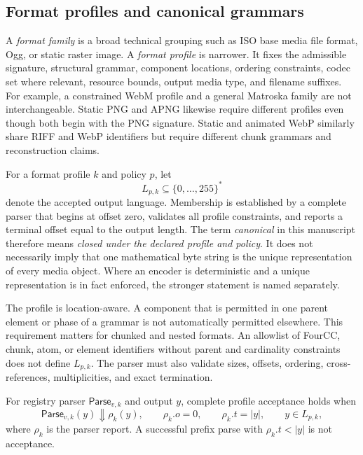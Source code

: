 \subsection{Format profiles and canonical grammars}

A \emph{format family} is a broad technical grouping such as ISO base media file
format, Ogg, or static raster image. A \emph{format profile} is narrower. It
fixes the admissible signature, structural grammar, component locations,
ordering constraints, codec set where relevant, resource bounds, output media
type, and filename suffixes. For example, a constrained WebM profile and a
general Matroska family are not interchangeable. Static PNG and APNG likewise
require different profiles even though both begin with the PNG signature.
Static and animated WebP similarly share RIFF and WebP identifiers but require
different chunk grammars and reconstruction claims.

For a format profile $k$ and policy $p$, let
\begin{equation}
  L_{p,k}\subseteq\{0,\ldots,255\}^{*}
  \label{eq:term-canonical-language}
\end{equation}
denote the accepted output language. Membership is established by a complete
parser that begins at offset zero, validates all profile constraints, and
reports a terminal offset equal to the output length. The term
\emph{canonical} in this manuscript therefore means \emph{closed under the
declared profile and policy}. It does not necessarily imply that one
mathematical byte string is the unique representation of every media object.
Where an encoder is deterministic and a unique representation is in fact
enforced, the stronger statement is named separately.

The profile is location-aware. A component that is permitted in one parent
element or phase of a grammar is not automatically permitted elsewhere. This
requirement matters for chunked and nested formats. An allowlist of FourCC,
chunk, atom, or element identifiers without parent and cardinality constraints
does not define $L_{p,k}$. The parser must also validate sizes,
offsets, ordering, cross-references, multiplicities, and exact termination.

\begin{definition}
For registry parser $\mathsf{Parse}_{v,k}$ and output $y$, complete profile acceptance holds when
\begin{equation}
  \mathsf{Parse}_{v,k}(y)\Downarrow\rho_k(y),\qquad
  \rho_k.o=0,\qquad \rho_k.t=|y|,\qquad
  y\in L_{p,k},
  \label{eq:complete-profile}
\end{equation}
where $\rho_k$ is the parser report. A successful prefix parse with
$\rho_k.t<|y|$ is not acceptance.
\end{definition}

